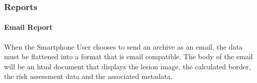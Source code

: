         \subsubsection{Reports}
            \paragraph{Email Report}
                When the Smartphone User chooses to send an archive as an email, the data must be flattened into a format that is email compatible. The body of the email will be an html document that displays the lesion image, the calculated border, the risk assessment data and the associated metadata.



